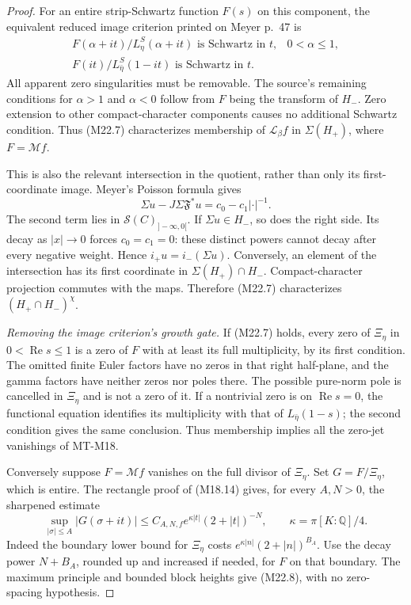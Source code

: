 \begin{proof}
For an entire strip-Schwartz function \(F(s)\)
on this component, the equivalent reduced
image criterion printed on Meyer p.~47 is
\[
 \begin{array}{ll}
 F(\alpha+it)/L_\eta^S(\alpha+it)
        \text{ is Schwartz in }t,&0<\alpha\le1,\\[2mm]
 F(it)/L_{\bar\eta}^S(1-it)
        \text{ is Schwartz in }t.&
 \end{array}                                                    \tag{M22.7}
\]
All apparent zero singularities must be removable.
The source's remaining conditions for
\(\alpha>1\) and \(\alpha<0\) follow from \(F\)
being the transform of \(H_-\).
Zero extension to other compact-character
components causes no additional Schwartz condition.
Thus (M22.7) characterizes membership of
\(\mathcal L_\beta f\) in \(\Sigma(H_+)\),
where \(F=\mathcal Mf\).

This is also the relevant intersection in
the quotient, rather than only its first-coordinate
image.  Meyer's Poisson formula gives
\[
 \Sigma u-J\Sigma\mathfrak F^*u
                         =c_0-c_1|\cdot|^{-1}.
\]
The second term lies in
\(\mathcal S(C)_{]-\infty,0[}\).
If \(\Sigma u\in H_-\), so does the right side.
Its decay as \(|x|\to0\) forces \(c_0=c_1=0\):
these distinct powers cannot decay after every
negative weight.  Hence
\(i_+u=i_-(\Sigma u)\).
Conversely, an element of the intersection has
its first coordinate in \(\Sigma(H_+)\cap H_-\).
Compact-character projection commutes with the
maps.  Therefore (M22.7) characterizes
\((H_+\cap H_-)^\chi\).

\emph{Removing the image criterion's growth gate.}
If (M22.7) holds, every zero of \(\Xi_\eta\) in
\(0<\operatorname{Re}s\le1\) is a zero of \(F\)
with at least its full multiplicity, by its first
condition.  The omitted finite Euler factors have
no zeros in that right half-plane, and the gamma
factors have neither zeros nor poles there.
The possible pure-norm pole is cancelled in
\(\Xi_\eta\) and is not a zero of it.
If a nontrivial zero is on \(\operatorname{Re}s=0\),
the functional equation identifies its multiplicity
with that of \(L_{\bar\eta}(1-s)\); the second
condition gives the same conclusion.
Thus membership implies all the zero-jet
vanishings of MT-M18.

Conversely suppose \(F=\mathcal Mf\) vanishes
on the full divisor of \(\Xi_\eta\).
Set \(G=F/\Xi_\eta\), which is entire.
The rectangle proof of (M18.14) gives,
for every \(A,N>0\), the sharpened estimate
\[
 \sup_{|\sigma|\le A}|G(\sigma+it)|
       \le C_{A,N,f}e^{\kappa|t|}(2+|t|)^{-N},
 \qquad \kappa=\pi[K:\mathbb Q]/4.                              \tag{M22.8}
\]
Indeed the boundary lower bound for \(\Xi_\eta\)
costs \(e^{\kappa|n|}(2+|n|)^{B_A}\).
Use the decay power \(N+B_A\), rounded up and
increased if needed, for \(F\) on that boundary.
The maximum principle and bounded block heights
give (M22.8), with no zero-spacing hypothesis.


\end{proof}
